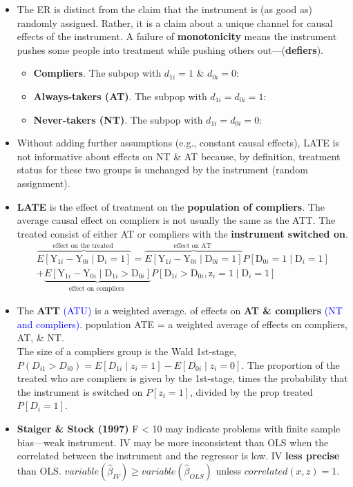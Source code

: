 \documentclass[
]{article}
\begin{document}
\begin{itemize}
\item
  The ER is distinct from the claim that the instrument is (as good as)
  randomly assigned. Rather, it is a claim about a unique channel for
  causal effects of the instrument. A failure of \textbf{monotonicity}
  means the instrument pushes some people into treatment while pushing
  others out---(\textbf{defiers}).

  \begin{itemize}
  \item
    \textbf{Compliers}. The subpop with \(d_{1i} = 1\) \&
    \(d_{0i} = 0\):
  \item
    \textbf{Always-takers (AT)}. The subpop with \(d_{1i} =d_{0i} = 1\):
  \item
    \textbf{Never-takers (NT)}. The subpop with \(d_{1i} =d_{0i} = 0\):
  \end{itemize}
\item
  Without adding further assumptions (e.g., constant causal effects),
  LATE is not informative about effects on NT \& AT because, by
  definition, treatment status for these two groups is unchanged by the
  instrument (random assignment).
\item
  \textbf{LATE} is the effect of treatment on the \textbf{population of
  compliers}. The average causal effect on compliers is not usually the
  same as the ATT. The treated consist of either AT or compliers with
  the \textbf{instrument switched on}. \[\begin{aligned}
  \overbrace{E\left[\mathrm{Y}_{1 i}-\mathrm{Y}_{0 i} \mid \mathrm{D}_{i}=1\right]}^{\text {effect on the treated }}
  = \overbrace{E\left[\mathrm{Y}_{1 i}-\mathrm{Y}_{0 i} \mid \mathrm{D}_{0 i}=1\right]}^{\text {effect on AT }}P\left[\mathrm{D}_{0 i}=1 \mid \mathrm{D}_{i}=1\right] \\
  + \underbrace{E\left[\mathrm{Y}_{1 i}-\mathrm{Y}_{0 i} \mid \mathrm{D}_{1 i}>\mathrm{D}_{0 i}\right]}_{\text {effect on compliers }}P\left[\mathrm{D}_{1 i}>\mathrm{D}_{0 i}, \mathrm{z}_{i}=1 \mid \mathrm{D}_{i}=1\right]
  \end{aligned}\]
\item
  The \textbf{ATT} \textcolor{blue}{(ATU)} is a weighted average. of
  effects on \textbf{AT \& compliers}
  \textcolor{blue}{(NT and compliers)}. population ATE = a weighted
  average of effects on compliers, AT, \& NT.\\
  The size of a compliers group is the Wald 1st-stage,
  \(P(D_{i1} > D_{i0})=E\left[D_{1 i} \mid z_i = 1\right] -E\left[D_{0 i}\mid z_{i}=0\right]\).
  The proportion of the treated who are compliers is given by the
  1st-stage, times the probability that the instrument is switched on
  \(P[z_i =1]\), divided by the prop treated \(P[D_i = 1]\).
\item
  \textbf{Staiger \& Stock (1997)} F \textless{} 10 may indicate
  problems with finite sample bias---weak instrument. IV may be more
  inconsistent than OLS when the correlated between the instrument and
  the regressor is low. IV \textbf{less precise} than OLS.
  \(variable(\hat{\beta}_{IV})\ge variable(\hat{\beta}_{OLS})\) unless
  \(correlated(x, z) = 1\).
\end{itemize}
\end{document}
